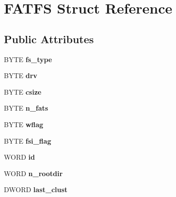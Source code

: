 \hypertarget{struct_f_a_t_f_s}{\section{F\-A\-T\-F\-S Struct Reference}
\label{struct_f_a_t_f_s}
}
\subsection*{Public Attributes}
\begin{DoxyCompactItemize}
\item 
\hypertarget{struct_f_a_t_f_s_add27d97babe807b573eac98a71dc4ae5}{B\-Y\-T\-E {\bfseries fs\-\_\-type}}\label{struct_f_a_t_f_s_add27d97babe807b573eac98a71dc4ae5}

\item 
\hypertarget{struct_f_a_t_f_s_a6a791560e2687e8b1569bfce61208d2d}{B\-Y\-T\-E {\bfseries drv}}\label{struct_f_a_t_f_s_a6a791560e2687e8b1569bfce61208d2d}

\item 
\hypertarget{struct_f_a_t_f_s_a504a1175f6dcc9a854b9da94463bd108}{B\-Y\-T\-E {\bfseries csize}}\label{struct_f_a_t_f_s_a504a1175f6dcc9a854b9da94463bd108}

\item 
\hypertarget{struct_f_a_t_f_s_a56716c7e7ac10cf46e73ffb2a2e9b545}{B\-Y\-T\-E {\bfseries n\-\_\-fats}}\label{struct_f_a_t_f_s_a56716c7e7ac10cf46e73ffb2a2e9b545}

\item 
\hypertarget{struct_f_a_t_f_s_a647e43c9ccae94b7274793d1909897de}{B\-Y\-T\-E {\bfseries wflag}}\label{struct_f_a_t_f_s_a647e43c9ccae94b7274793d1909897de}

\item 
\hypertarget{struct_f_a_t_f_s_a84e9cdc5a6a8e33ea7ec192058abf161}{B\-Y\-T\-E {\bfseries fsi\-\_\-flag}}\label{struct_f_a_t_f_s_a84e9cdc5a6a8e33ea7ec192058abf161}

\item 
\hypertarget{struct_f_a_t_f_s_a417095d7c20d56d417dc0998e0dd5a5c}{W\-O\-R\-D {\bfseries id}}\label{struct_f_a_t_f_s_a417095d7c20d56d417dc0998e0dd5a5c}

\item 
\hypertarget{struct_f_a_t_f_s_a189a00aa038044ffad0fc7f7dcf2aae1}{W\-O\-R\-D {\bfseries n\-\_\-rootdir}}\label{struct_f_a_t_f_s_a189a00aa038044ffad0fc7f7dcf2aae1}

\item 
\hypertarget{struct_f_a_t_f_s_ad315def289218e26ab78ff90fde700d1}{D\-W\-O\-R\-D {\bfseries last\-\_\-clust}}\label{struct_f_a_t_f_s_ad315def289218e26ab78ff90fde700d1}


\end{DoxyCompactItemize}
